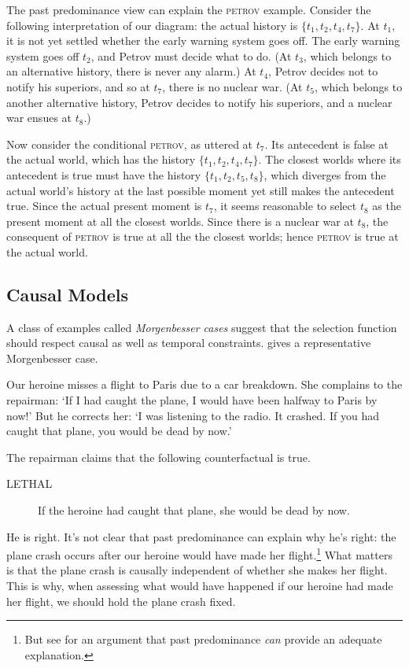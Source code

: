 The past predominance view can explain the \textsc{petrov} example.  Consider the following interpretation of our diagram: the actual history is $\{t_1, t_2, t_4, t_7\}$. At $t_1$, it is not yet settled whether the early warning system goes off.  The early warning system goes off $t_2$, and Petrov must decide what to do.  (At $t_3$, which belongs to an alternative history, there is never any alarm.)  At $t_4$, Petrov decides not to notify his superiors, and so at $t_7$, there is no nuclear war.  (At $t_5$, which belongs to another alternative history, Petrov decides to notify his superiors, and a nuclear war ensues at $t_8$.)

Now consider the conditional \textsc{petrov}, as uttered at $t_7$.  Its antecedent is false at the actual world, which has the history $\{t_1, t_2, t_4, t_7\}$.  The closest worlds where its antecedent is true must have the history $\{t_1, t_2, t_5, t_8\}$, which diverges from the actual world's history at the last possible moment yet still makes the antecedent true.  Since the actual present moment is $t_7$, it seems reasonable to select $t_8$ as the present moment at all the closest worlds. Since there is a nuclear war at $t_8$, the consequent of \textsc{petrov} is true at all the the closest worlds; hence \textsc{petrov} is true at the actual world.


\subsection{Causal Models}

A class of examples called \emph{Morgenbesser cases} \citep[27n]{slote-counterfactuals} suggest that the selection function should respect causal as well as temporal constraints.   \citet{Edgington2004-EDGCAT} gives a representative Morgenbesser case.

Our heroine misses a flight to Paris due to a car breakdown.  She complains to the repairman: `If I had caught the plane, I would have been halfway to Paris by now!'  But he corrects her: `I was listening to the radio.  It crashed.  If you had caught that plane, you would be dead by now.'

The repairman claims that the following counterfactual is true.
\begin{description}
\item[LETHAL] If the heroine had caught that plane, she would be dead by now.
\end{description}
He is right.  It's not clear that past predominance can explain why he's right: the plane crash occurs after our heroine would have made her flight.\footnote{But see \citet{Phillips2007-PHIMCA} for an argument that past predominance \emph{can} provide an adequate explanation.}  What matters is that the plane crash is causally independent of whether she makes her flight.  This is why, when assessing what would have happened if our heroine had made her flight, we should hold the plane crash fixed.

